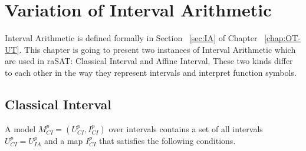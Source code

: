 \chapter{Variation of Interval Arithmetic}
Interval Arithmetic is defined formally in Section ~\ref{sec:IA} of Chapter ~\ref{chap:OT-UT}. This chapter is going to present two instances of Interval Arithmetic which are used in raSAT: Classical Interval and Affine Interval. These two kinds differ to each other in the way they represent intervals and interpret function symbols.

\section{Classical Interval}
A model $M^p_{CI} = (U^p_{CI}, I^p_{CI})$ over intervals contains a set of all intervals $U^p_{CI} = U^p_{IA}$ and a map $I^p_{CI}$ that satisfies the following conditions.
